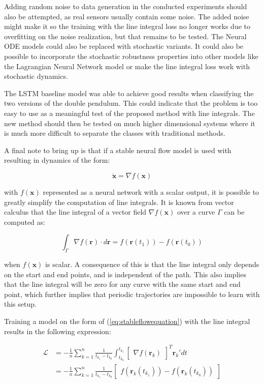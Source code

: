 \documentclass[12pt,a4paper]{book}
\begin{document}
Adding random noise to data generation in the conducted experiments should also be attempted, as real sensors usually contain some noise. The added noise might make it so the training with the line integral loss no longer works due to overfitting on the noise realization, but that remains to be tested. The Neural ODE models could also be replaced with stochastic variants. It could also be possible to incorporate the stochastic robustness properties into other models like the Lagrangian Neural Network model or make the line integral loss work with stochastic dynamics.

The LSTM baseline model was able to achieve good results when classifying the two versions of the double pendulum. This could indicate that the problem is too easy to use as a meaningful test of the proposed method with line integrals. The new method should then be tested on much higher dimensional systems where it is much more difficult to separate the classes with traditional methods.

A final note to bring up is that if a stable neural flow model is used with resulting in dynamics of the form:

\begin{equation}
    \dot{\bm{x}} = \nabla f(\bm{x})
    \label{eq:stableflowequation}
\end{equation}

\noindent with $f(\bm{x})$ represented as a neural network with a scalar output, it is possible to greatly simplify the computation of line integrals. It is known from vector calculus that the line integral of a vector field $\nabla f(\bm{x})$ over a curve $\Gamma$ can be computed as:

\begin{equation}
    \int_{\Gamma} \nabla f(\bm{r}) \cdot d \bm{r} = f(\bm{r}(t_1)) - f(\bm{r}(t_0))
\end{equation}

\noindent when $f(\bm{x})$ is scalar. A consequence of this is that the line integral only depends on the start and end points, and is independent of the path. This also implies that the line integral will be zero for any curve with the same start and end point, which further implies that periodic trajectories are impossible to learn with this setup.

Training a model on the form of (\ref{eq:stableflowequation}) with the line integral results in the following expression:

\begin{equation}
    \begin{aligned}
        \mathcal{L}
        &= - \frac{1}{n} \sum_{k=1}^{n} \frac{1}{t_{k_1} - t_{k_0}} \int_{t_{k_0}}^{t_{k_1}} \begin{bmatrix} \nabla f(\bm{r}_k) \end{bmatrix}^T \bm{r}_k' dt \\
        &= - \frac{1}{n} \sum_{k=1}^{n} \frac{1}{t_{k_1} - t_{k_0}} \begin{bmatrix} f(\bm{r}_k(t_{k_1})) - f(\bm{r}_k(t_{k_0})) \end{bmatrix}
    \end{aligned}
    \label{eq:lineintegralstableflow}
\end{equation}
\end{document}
